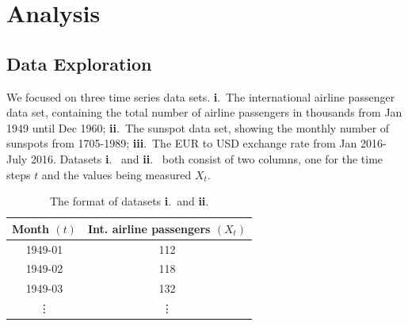 \documentclass[10pt,a4paper]{article}
\begin{document}
\newpage
\section{Analysis}

\subsection{Data Exploration}
%
We focused on three time series data sets. {\bf i}.~The international airline passenger data set, containing the total number of airline passengers in thousands from Jan 1949 until Dec 1960; {\bf ii}.~The sunspot data set, showing the monthly number of sunspots from 1705-1989; {\bf iii}.~The EUR to USD exchange rate from Jan 2016- July 2016. Datasets {\bf i}.~ and {\bf ii}.~ both consist of two columns, one for the time steps $t$ and the values being measured $X_t$. 

\begin{table}[h]
\centering
\begin{tabular}{ c c }
Month $(t)$ & Int. airline passengers $(X_t)$ \\ \hline
 1949-01 & 112 \\ 
 1949-02 & 118  \\  
 1949-03 & 132   \\
 \vdots & \vdots 
\end{tabular}
\caption{The format of datasets {\bf i}.~and {\bf ii}.}
\label{table: sample format of dataset i and ii}
\end{table}
\end{document}
